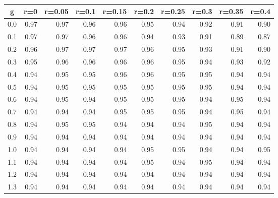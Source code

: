 %
\begin{table}[!tbp]
 \begin{center}
 \begin{tabular}{rrrrrrrrrr}\hline\hline
\multicolumn{1}{c}{g}&\multicolumn{1}{c}{r=0}&\multicolumn{1}{c}{r=0.05}&\multicolumn{1}{c}{r=0.1}&\multicolumn{1}{c}{r=0.15}&\multicolumn{1}{c}{r=0.2}&\multicolumn{1}{c}{r=0.25}&\multicolumn{1}{c}{r=0.3}&\multicolumn{1}{c}{r=0.35}&\multicolumn{1}{c}{r=0.4}\tabularnewline
\hline
0.0&0.97&0.97&0.96&0.96&0.95&0.94&0.92&0.91&0.90\tabularnewline
0.1&0.97&0.97&0.96&0.96&0.94&0.93&0.91&0.89&0.87\tabularnewline
0.2&0.96&0.97&0.97&0.97&0.96&0.95&0.93&0.91&0.90\tabularnewline
0.3&0.95&0.96&0.96&0.96&0.96&0.95&0.94&0.93&0.92\tabularnewline
0.4&0.94&0.95&0.95&0.96&0.96&0.95&0.95&0.94&0.94\tabularnewline
0.5&0.94&0.95&0.95&0.95&0.95&0.95&0.95&0.94&0.94\tabularnewline
0.6&0.94&0.95&0.94&0.95&0.95&0.95&0.94&0.95&0.94\tabularnewline
0.7&0.94&0.94&0.94&0.95&0.95&0.95&0.94&0.95&0.94\tabularnewline
0.8&0.94&0.95&0.95&0.94&0.94&0.94&0.95&0.94&0.94\tabularnewline
0.9&0.94&0.94&0.94&0.94&0.94&0.94&0.94&0.94&0.94\tabularnewline
1.0&0.94&0.94&0.94&0.94&0.95&0.95&0.94&0.94&0.95\tabularnewline
1.1&0.94&0.94&0.94&0.94&0.95&0.94&0.95&0.94&0.94\tabularnewline
1.2&0.94&0.94&0.94&0.94&0.94&0.94&0.94&0.94&0.94\tabularnewline
1.3&0.94&0.94&0.94&0.94&0.94&0.94&0.94&0.94&0.94\tabularnewline
\hline
\end{tabular}

\end{center}

\end{table}

